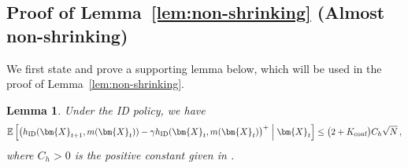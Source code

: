 \documentclass{article}
\theoremstyle{plain}
\newtheorem{lemma}{Lemma}
\theoremstyle{remark}
\newcommand{\givenmiddle}{\;\middle|\;}
\newcommand{\ID}{\textnormal{ID}}
\newcommand{\conf}{\text{conf}}
\def\mX{{\bm{X}}}
\newcommand{\EE}{\mathbb{E}}
\newcommand{\mbracket}[1]{\left[#1\right]}
\begin{document}
\subsection{Proof of Lemma~\ref{lem:non-shrinking} (Almost non-shrinking)}

We first state and prove a supporting lemma below, which will be used in the proof of Lemma~\ref{lem:non-shrinking}.

\begin{lemma}\label{lem:focus set drift}
    Under the ID policy, we have 
    \begin{align*}
        \EE\mbracket{\big(h_{\ID}(\mX_{t+1},m(\mX_t))- \gamma h_{\ID}(\mX_{t},m(\mX_t)\big)^+\givenmiddle\mX_t}\leq \big(2 + K_{\conf}\big) C_h\sqrt{N}\,,
    \end{align*}
    where $C_h > 0$ is the positive constant given in . 
\end{lemma}
\end{document}
